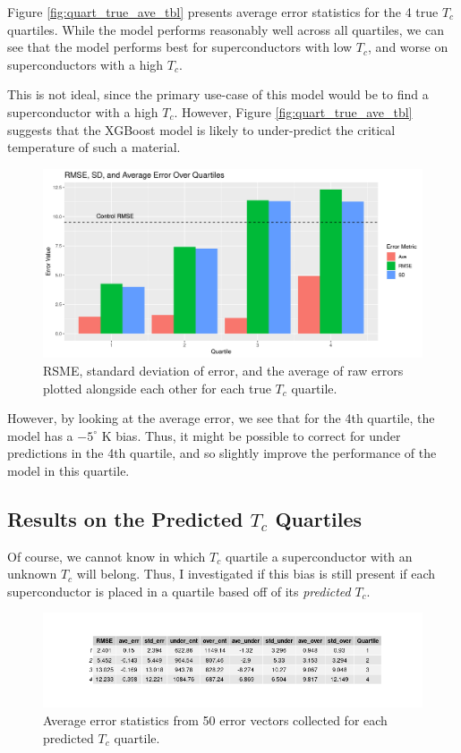 \documentclass[oneside,12pt]{amsart}
\begin{document}
 Figure \ref{fig:quart_true_ave_tbl} presents average error statistics for the 4 true $T_c$ quartiles. While the model performs reasonably well across all quartiles, we can see that the model performs best for superconductors with low $T_c$, and worse on superconductors with a high $T_c$. 
 
 This is not ideal, since the primary use-case of this model would be to find a superconductor with a high $T_c$. However, Figure \ref{fig:quart_true_ave_tbl} suggests that the XGBoost model is likely to under-predict the critical temperature of such a material.
 

 \begin{figure}
     \centering
     \includegraphics[width=0.8\linewidth]{../Plots/True_Q_error_brplt.png}
     \caption{RSME, standard deviation of error, and the average of raw errors plotted alongside each other for each true $T_c$ quartile.}
     \label{fig:True_Q_Ave_brplt}
 \end{figure}
  
   However, by looking at the average error, we see that for the 4th quartile, the model has a $-5^\circ$ K bias. Thus, it might be possible to correct for under predictions in the 4th quartile, and so slightly improve the performance of the model in this quartile.
 
\subsection{Results on the Predicted $T_c$ Quartiles}
Of course, we cannot know in which $T_c$ quartile a superconductor with an unknown $T_c$ will belong. Thus, I investigated if this bias is still present if each superconductor is placed in a quartile based off of its \textit{predicted} $T_c$.


\begin{figure}
    \centering
    \includegraphics[width=\linewidth]{../Plots/quartile_pred_tbl.png}
    \caption{Average error statistics from 50 error vectors collected for each predicted $T_c$ quartile.}
    \label{fig:quart_pred_ave_tbl}
\end{figure}
\end{document}
